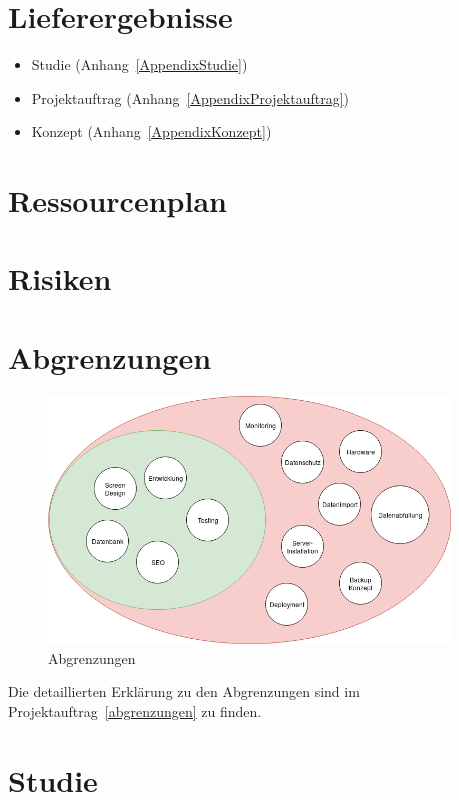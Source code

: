 \section{Lieferergebnisse}

\begin{itemize}
  \tightlist{}
  \item{}Studie (Anhang~\ref{AppendixStudie})
  \item{}Projektauftrag (Anhang~\ref{AppendixProjektauftrag})
  \item{}Konzept (Anhang~\ref{AppendixKonzept})
\end{itemize}

\section{Ressourcenplan}

\section{Risiken}

\clearpage

\section{Abgrenzungen}

\begin{figure}[!htb]
  \centering
  \includegraphics[width=0.95\textwidth]{figures/abgrenzungen.png}
  \caption{Abgrenzungen}
\end{figure}

Die detaillierten Erklärung zu den Abgrenzungen sind im Projektauftrag~\ref{abgrenzungen} zu finden.

\clearpage

\section{Studie}

